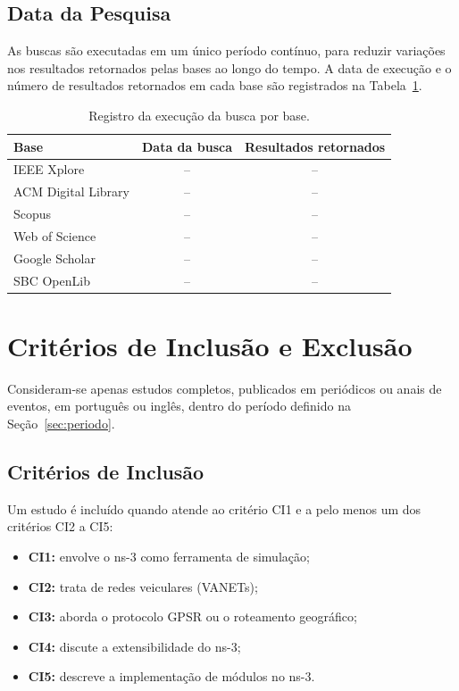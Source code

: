 \subsection{Data da Pesquisa}
\label{sec:data-pesquisa}

As buscas são executadas em um único período contínuo, para reduzir variações nos
resultados retornados pelas bases ao longo do tempo. A data de execução e o número de
resultados retornados em cada base são registrados na Tabela~\ref{tab:busca}.

\begin{table}[ht]
\centering
\caption{Registro da execução da busca por base.}
\label{tab:busca}
\small
\begin{tabular}{|l|c|c|}
\hline
\textbf{Base} & \textbf{Data da busca} & \textbf{Resultados retornados} \\ \hline
IEEE Xplore & -- & -- \\ \hline
ACM Digital Library & -- & -- \\ \hline
Scopus & -- & -- \\ \hline
Web of Science & -- & -- \\ \hline
Google Scholar & -- & -- \\ \hline
SBC OpenLib & -- & -- \\ \hline
\end{tabular}

\par\vspace{0.1cm}{\small Fonte: elaborado pelo autor.}
\end{table}

\section{Critérios de Inclusão e Exclusão}
\label{sec:criterios}

Consideram-se apenas estudos completos, publicados em periódicos ou anais de eventos, em
português ou inglês, dentro do período definido na Seção~\ref{sec:periodo}.

\subsection{Critérios de Inclusão}
\label{sec:inclusao}

Um estudo é incluído quando atende ao critério CI1 e a pelo menos um dos critérios CI2 a CI5:

\begin{itemize}
  \item \textbf{CI1:} envolve o ns-3 como ferramenta de simulação;
  \item \textbf{CI2:} trata de redes veiculares (VANETs);
  \item \textbf{CI3:} aborda o protocolo GPSR ou o roteamento geográfico;
  \item \textbf{CI4:} discute a extensibilidade do ns-3;
  \item \textbf{CI5:} descreve a implementação de módulos no ns-3.
\end{itemize}

